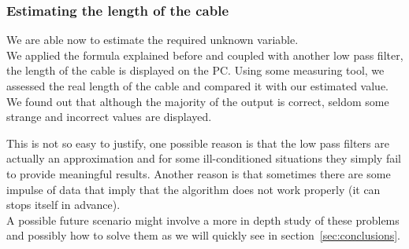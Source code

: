 \subsubsection{Estimating the length of the cable}
We are able now to estimate the required unknown variable. \\ We applied the formula explained before and coupled with another low pass filter, the length of the cable is displayed on the PC. Using some measuring tool, we assessed the real length of the cable and compared it with our estimated value. We found out that although the majority of the output is correct, seldom some strange and incorrect values are displayed. \par This is not so easy to justify, one possible reason is that the low pass filters are actually an approximation and for some ill-conditioned situations they simply fail to provide meaningful results. Another reason is that sometimes there are some impulse of data that imply that the algorithm does not work properly (it can stops itself in advance).\\
A possible future scenario might involve a more in depth study of these problems and possibly how to solve them as we will quickly see in section~\ref{sec:conclusions}.
